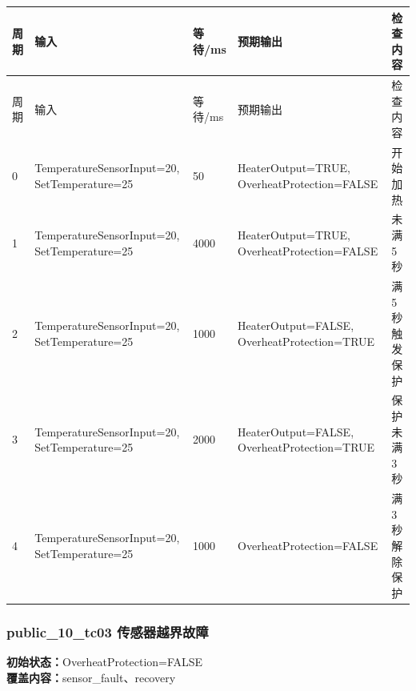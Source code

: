 \begin{longtable}{L{1.0cm}L{4.7cm}L{1.4cm}L{4.0cm}L{2.1cm}}

\toprule

周期 & 输入 & 等待/ms & 预期输出 & 检查内容\\

\midrule

\endfirsthead

\toprule

周期 & 输入 & 等待/ms & 预期输出 & 检查内容\\

\midrule

\endhead

0 & TemperatureSensorInput=20, SetTemperature=25 & 50 & HeaterOutput=TRUE, OverheatProtection=FALSE & 开始加热\\

1 & TemperatureSensorInput=20, SetTemperature=25 & 4000 & HeaterOutput=TRUE, OverheatProtection=FALSE & 未满 5 秒\\

2 & TemperatureSensorInput=20, SetTemperature=25 & 1000 & HeaterOutput=FALSE, OverheatProtection=TRUE & 满 5 秒触发保护\\

3 & TemperatureSensorInput=20, SetTemperature=25 & 2000 & HeaterOutput=FALSE, OverheatProtection=TRUE & 保护未满 3 秒\\

4 & TemperatureSensorInput=20, SetTemperature=25 & 1000 & OverheatProtection=FALSE & 满 3 秒解除保护\\

\bottomrule

\end{longtable}

\subsubsection{{\ttfamily public\_10\_tc03} 传感器越界故障}

\noindent\textbf{初始状态：}OverheatProtection=FALSE\\

\textbf{覆盖内容：}sensor\_fault、recovery

